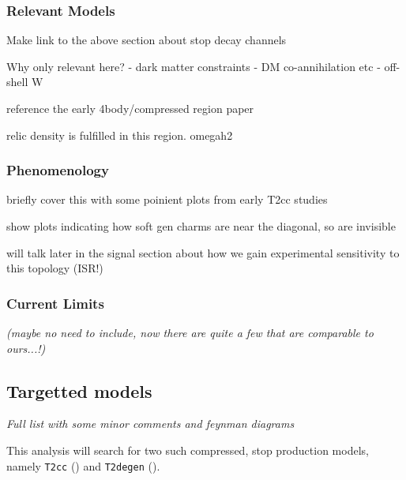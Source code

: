 \subsubsection{Relevant Models}
Make link to the above section about stop decay channels

Why only relevant here?
- dark matter constraints - DM co-annihilation etc
- off-shell W

reference the early 4body/compressed region paper

relic density is fulfilled in this region. omegah2

\subsubsection{Phenomenology}
briefly cover this with some poinient plots from early T2cc studies

show plots indicating how soft gen charms are near the diagonal, so are
invisible

will talk later in the signal section about how we gain experimental sensitivity
to this topology (ISR!)

\subsubsection{Current Limits}
\emph{(maybe no need to include, now there are quite a few that are comparable
to
ours...!)}

\subsection{Targetted models}
\emph{Full list with some minor comments and feynman diagrams}

This analysis will search for two such compressed, stop production models,
namely \texttt{T2cc} (\Ttwocc) and \texttt{T2degen} (\Ttwodegen).